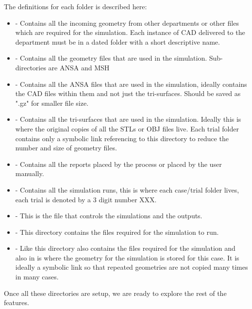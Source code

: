 The definitions for each folder is described here:
\begin{itemize}
    \item {} - Contains all the incoming geometry from other departments or other files which are required for the simulation. Each instance of CAD delivered to the department must be in a dated folder with a short descriptive name.
    \item {} - Contains all the geometry files that are used in the simulation. Sub-directories are ANSA and MSH
    \item {} - Contains all the ANSA files that are used in the simulation, ideally contains the CAD files within them and not just the tri-surfaces. Should be saved as ".gz" for smaller file size.
    \item {} - Contains all the tri-surfaces that are used in the simulation. Ideally this is where the original copies of all the STLs or OBJ files live. Each trial folder contains only a symbolic link referencing to this directory to reduce the number and size of geometry files.
    \item {} - Contains all the reports placed by the  process or placed by the user manually.
    \item {} - Contains all the simulation runs, this is where each case/trial folder lives, each trial is denoted by a 3 digit number XXX.
    \item {} - This is the file that controls the simulations and the outputs.
    \item {} - This directory contains the files required for the simulation to run.
    \item {} - Like  this directory also contains the files required for the simulation and also in  is where the geometry for the simulation is stored for this case. It is ideally a symbolic link so that repeated geometries are not copied many times in many cases.
\end{itemize} 

Once all these directories are setup, we are ready to explore the rest of the features.


